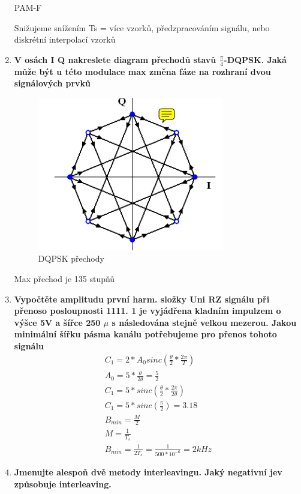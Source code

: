 \begin{enumerate}
    PAM-F
    
    Snižujeme snížením Ts = více vzorků, předzpracováním signálu, nebo diskrétní interpolací vzorků

    \item \textbf{V osách I Q nakreslete diagram přechodů stavů $\frac{\pi}{4}$-DQPSK. Jaká může být u této modulace max změna fáze na rozhraní dvou signálových prvků}
    \begin{figure}[h!]
        \centering
        \includegraphics{images/DQPSK.png}
        \caption{DQPSK přechody}
        \label{fig:enter-label}
    \end{figure}
    
    Max přechod je 135 stupňů

    \item \textbf{Vypočtěte amplitudu první harm. složky Uni RZ signálu při přenoso posloupnosti 1111. 1 je vyjádřena kladním impulzem o výšce 5V a šířce 250 $\mu$ s následována stejně velkou mezerou. Jakou minimální šířku pásma kanálu potřebujeme pro přenos tohoto signálu}
    \begin{gather*}
        C_1=2*A_0sinc(\frac{\theta}{2}*\frac{2\pi}{T})\\
        A_0=5*\frac{\theta}{2\theta}=\frac{5}{2}\\
        C_1=5*sinc(\frac{\theta}{2}*\frac{2\pi}{2\theta})\\
        C_1=5*sinc(\frac{\pi}{2})= 3.18 \\
        B_{min}=\frac{M}{2}\\
        M=\frac{1}{T_s}\\
        B_{min}=\frac{1}{2T_s}=\frac{1}{500*10^{-6}}=2kHz
    \end{gather*}
    \item \textbf{Jmenujte alespoň dvě metody interleavingu. Jaký negativní jev způsobuje interleaving.}


\end{enumerate}
